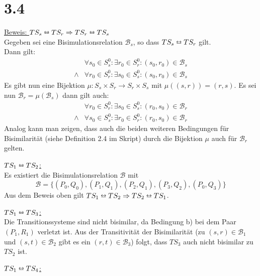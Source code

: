 \documentclass{article}
\begin{document}
\section*{3.4}
\underline{Beweis: $TS_s \leftrightarroweq TS_r \Rightarrow TS_r
\leftrightarroweq TS_s$}\\
Gegeben sei eine Bisimulationsrelation $\mathcal{B}_s$, so dass $TS_s
\leftrightarroweq TS_r$ gilt.\\
Dann gilt:
\begin{align*}
&\forall s_0 \in S_s^0 : \exists r_0 \in S_r^0 : (s_0,r_0) \in \mathcal{B}_s \\
\wedge & \forall r_0 \in S_r^0 : \exists s_0 \in S_s^0 : (s_0,r_0) \in \mathcal{B}_s
\end{align*}
Es gibt nun eine Bijektion $\mu : S_s \times S_r \to S_r \times S_{s}$ mit
$\mu((s,r)) = (r,s)$.
Es sei nun $\mathcal{B}_r = \mu(\mathcal{B}_s)$ dann gilt auch:
\begin{align*}
&\forall r_0 \in S_r^0 : \exists s_0 \in S_s^0 : (r_0,s_0) \in \mathcal{B}_r \\
\wedge & \forall s_0 \in S_s^0 : \exists r_0 \in S_r^0 : (r_0,s_0) \in
\mathcal{B}_r
\end{align*}
Analog kann man zeigen, dass auch die beiden weiteren Bedingungen für
Bisimilarität (siehe Definition 2.4 im Skript) durch die Bijektion $\mu$ auch
für $\mathcal{B}_r$ gelten.

\underline{$TS_1 \leftrightarroweq TS_2$:}\\
Es existiert die Bisimulationsrelation $\mathcal{B}$ mit
\[
    \mathcal{B} = \{ (P_0,Q_0), (P_1,Q_1), (P_2,Q_1), (P_3,Q_2), (P_0,Q_3)\}
\]
Aus dem Beweis oben gilt $TS_1 \leftrightarroweq TS_2 \Rightarrow TS_2
\leftrightarroweq TS_1$.

\underline{$TS_1 \leftrightarroweq TS_3$:}\\
Die Transitionssysteme sind nicht bisimilar, da Bedingung b) bei dem Paar
$(P_1,R_1)$ verletzt ist.
Aus der Transitivität der Bisimilarität (zu $(s,r) \in \mathcal{B}_1$ und $(s,t)
\in \mathcal{B}_2$ gibt es ein $(r,t) \in \mathcal{B}_3$) folgt, dass $TS_3$
auch nicht bisimilar zu $TS_2$ ist.

\underline{$TS_1 \leftrightarroweq TS_4$:}\\
\end{document}
